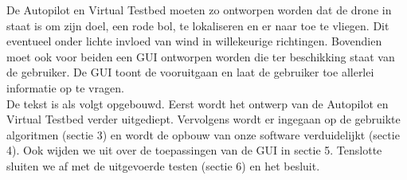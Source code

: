 De Autopilot en Virtual Testbed moeten zo ontworpen worden dat de drone in staat is om zijn doel, een rode bol, te lokaliseren en er naar toe te vliegen. Dit eventueel onder lichte invloed van wind in willekeurige richtingen. Bovendien moet ook voor beiden een GUI ontworpen worden die ter beschikking staat van de gebruiker. De GUI toont de vooruitgaan en laat de gebruiker toe allerlei informatie op te vragen. \\

De tekst is als volgt opgebouwd. Eerst wordt het ontwerp van de Autopilot en Virtual Testbed verder uitgediept. Vervolgens wordt er ingegaan op de gebruikte algoritmen (sectie 3) en wordt de opbouw van onze software verduidelijkt (sectie 4). Ook wijden we uit over de toepassingen van de GUI in sectie 5. Tenslotte sluiten we af met de uitgevoerde testen (sectie 6) en het besluit. \\